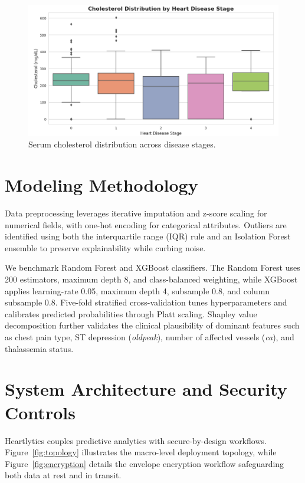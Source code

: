\documentclass[conference]{IEEEtran}
\begin{document}
\begin{figure}[t]
  \centering
  \includegraphics[width=0.85\linewidth]{serum_cholesterol_across_disease_stages.png}
  \caption{Serum cholesterol distribution across disease stages.}
  \label{fig:chol}
\end{figure}

\section{Modeling Methodology}
Data preprocessing leverages iterative imputation and z-score scaling for numerical fields, with one-hot encoding for categorical attributes. Outliers are identified using both the interquartile range (IQR) rule and an Isolation Forest ensemble to preserve explainability while curbing noise.

We benchmark Random Forest and XGBoost classifiers. The Random Forest uses 200 estimators, maximum depth 8, and class-balanced weighting, while XGBoost applies learning-rate 0.05, maximum depth 4, subsample 0.8, and column subsample 0.8. Five-fold stratified cross-validation tunes hyperparameters and calibrates predicted probabilities through Platt scaling. Shapley value decomposition further validates the clinical plausibility of dominant features such as chest pain type, ST depression (\textit{oldpeak}), number of affected vessels (\textit{ca}), and thalassemia status.

\section{System Architecture and Security Controls}
Heartlytics couples predictive analytics with secure-by-design workflows. Figure~\ref{fig:topology} illustrates the macro-level deployment topology, while Figure~\ref{fig:encryption} details the envelope encryption workflow safeguarding both data at rest and in transit.
\end{document}

